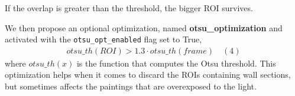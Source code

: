 \documentclass[10pt,twocolumn,letterpaper]{article}
\begin{document}
If the overlap is greater than the threshold, the bigger ROI survives.

We then propose an optional optimization, named \textbf{otsu\_optimization} and activated with the 
{\tt otsu\_opt\_enabled} flag set to True,
\begin{gather*}
	otsu\_th(ROI) > 1.3 \cdot otsu\_th(frame) \quad (4)
\end{gather*}
 where \(otsu\_th(x)\) is the function that computes the Otsu threshold. 
This optimization helps when it comes to discard the ROIs containing \eg wall sections,
but sometimes affects the paintings that are overexposed to the light.

\begin{figure}
    \centering
    \\
    \\
    \\
    \\

\end{figure}
\end{document}
